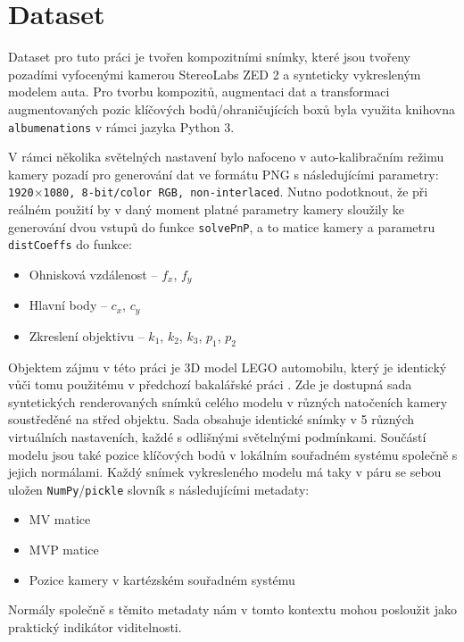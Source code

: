 \chapter{Dataset}
\label{sec:Chapter3}
Dataset pro tuto práci je tvořen kompozitními snímky, které jsou tvořeny pozadími vyfocenými kamerou StereoLabs ZED 2 a synteticky vykresleným modelem auta. Pro tvorbu kompozitů, augmentaci dat a transformaci augmentovaných pozic klíčových bodů/ohraničujících boxů byla využita knihovna \texttt{albumenations} v rámci jazyka Python 3. 

V rámci několika světelných nastavení bylo nafoceno v auto-kalibračním režimu kamery pozadí pro generování dat ve formátu PNG s následujícími parametry: \texttt{1920$\times$1080, 8-bit/color RGB, non-interlaced}. Nutno podotknout, že při reálném použití by v daný moment platné parametry kamery sloužily ke generování dvou vstupů do funkce \texttt{solvePnP}, a to matice kamery a parametru \texttt{distCoeffs} do funkce:
\begin{itemize}
    \item Ohnisková vzdálenost -- $f_x$, $f_y$
    \item Hlavní body -- $c_x$, $c_y$
    \item Zkreslení objektivu -- $k_1$, $k_2$, $k_3$, $p_1$, $p_2$
\end{itemize}

Objektem zájmu v této práci je 3D model LEGO automobilu, který je identický vůči tomu použitému v předchozí bakalářské práci \cite{mojebp}. Zde je dostupná sada syntetických renderovaných snímků celého modelu v různých natočeních kamery soustředěné na střed objektu. Sada obsahuje identické snímky v 5 různých virtuálních nastaveních, každé s odlišnými světelnými podmínkami. Součástí modelu jsou také pozice klíčových bodů v lokálním souřadném systému společně s jejich normálami. Každý snímek vykresleného modelu má taky v páru se sebou uložen \texttt{NumPy}/\texttt{pickle} slovník s následujícími metadaty:
\begin{itemize}
    \item MV matice
    \item MVP matice
    \item Pozice kamery v kartézském souřadném systému
\end{itemize}
Normály společně s těmito metadaty nám v tomto kontextu mohou posloužit jako praktický indikátor viditelnosti.


